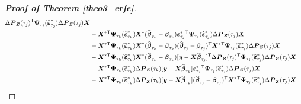 \documentclass[15pt,a4paper]{article}
\newcommand{\transpose}{{}^{\text{\sffamily T}}}
\begin{document}
\begin{proof}[\textbf{Proof of Theorem \ref{theo3_erfe}}]
\begin{equation*}
\begin{split}
        \Delta\boldsymbol{P}_{\boldsymbol{Z}}(\tau_{j})\transpose\boldsymbol{\Psi}_{\tau_j}(\widehat{\boldsymbol{\varepsilon}}^{*}_{\tau_j})\Delta\boldsymbol{P}_{\boldsymbol{Z}}(\tau_j)\boldsymbol{X}\\
& - \boldsymbol{X}^{*}\transpose\boldsymbol{\Psi}_{\tau_k}(\widehat{\boldsymbol{\varepsilon}}^{*}_{\tau_k})\boldsymbol{X}^{*} (\widehat{\boldsymbol{\beta}}_{\tau_{k}} - \boldsymbol{\beta}_{\tau_{k}})\boldsymbol{\varepsilon}^{*}_{\tau_{j}}\transpose
    \boldsymbol{\Psi}_{\tau_j}(\widehat{\boldsymbol{\varepsilon}}^{*}_{\tau_j})\Delta\boldsymbol{P}_{\boldsymbol{Z}}(\tau_j)\boldsymbol{X}\\
& + \boldsymbol{X}^{*}\transpose\boldsymbol{\Psi}_{\tau_k}(\widehat{\boldsymbol{\varepsilon}}^{*}_{\tau_k})\boldsymbol{X}^{*} (\widehat{\boldsymbol{\beta}}_{\tau_{k}} - \boldsymbol{\beta}_{\tau_{k}})(\widehat{\boldsymbol{\beta}}_{\tau_{j}} -         \boldsymbol{\beta}_{\tau_{j}})\transpose\boldsymbol{X}^{*}\transpose\boldsymbol{\Psi}_{\tau_j}(\widehat{\boldsymbol{\varepsilon}}^{*}_{\tau_j})\Delta\boldsymbol{P}_{\boldsymbol{Z}}(\tau_j)\boldsymbol{X}\\
& - \boldsymbol{X}^{*}\transpose\boldsymbol{\Psi}_{\tau_k}(\widehat{\boldsymbol{\varepsilon}}^{*}_{\tau_k})\boldsymbol{X}^{*} (\widehat{\boldsymbol{\beta}}_{\tau_{k}} -     
    \boldsymbol{\beta}_{\tau_{k}})[\boldsymbol{y}-\boldsymbol{X}\widehat{\boldsymbol{\beta}}_{\tau_{j}}]\transpose\Delta\boldsymbol{P}_{\boldsymbol{Z}}(\tau_{j})\transpose\boldsymbol{\Psi}_{\tau_j}
    (\widehat{\boldsymbol{\varepsilon}}^{*}_{\tau_j})\Delta\boldsymbol{P}_{\boldsymbol{Z}}(\tau_j)\boldsymbol{X}\\
& + \boldsymbol{X}^{*}\transpose\boldsymbol{\Psi}_{\tau_k}(\widehat{\boldsymbol{\varepsilon}}^{*}_{\tau_k})\Delta\boldsymbol{P}_{\boldsymbol{Z}}(\tau_{k})[\boldsymbol{y}-\boldsymbol{X}\widehat{\boldsymbol{\beta}}_{\tau_{k}}]
    \boldsymbol{\varepsilon}^{*}_{\tau_{j}}\transpose\boldsymbol{\Psi}_{\tau_j}(\widehat{\boldsymbol{\varepsilon}}^{*}_{\tau_j})\Delta\boldsymbol{P}_{\boldsymbol{Z}}(\tau_j)\boldsymbol{X}\\
& - \boldsymbol{X}^{*}\transpose\boldsymbol{\Psi}_{\tau_k}(\widehat{\boldsymbol{\varepsilon}}^{*}_{\tau_k})\Delta\boldsymbol{P}_{\boldsymbol{Z}}(\tau_{k})[\boldsymbol{y}-\boldsymbol{X}\widehat{\boldsymbol{\beta}}_{\tau_{k}}]
    (\widehat{\boldsymbol{\beta}}_{\tau_{j}} - \boldsymbol{\beta}_{\tau_{j}})\transpose\boldsymbol{X}^{*}\transpose\boldsymbol{\Psi}_{\tau_j}(\widehat{\boldsymbol{\varepsilon}}^{*}_{\tau_j})
    \Delta\boldsymbol{P}_{\boldsymbol{Z}}(\tau_j)\boldsymbol{X}\\

\end{split}
\end{equation*}
\end{proof}
\end{document}
